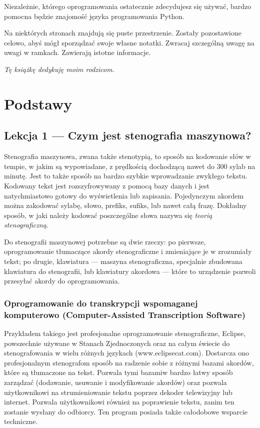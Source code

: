 \documentclass[12p, oneside]{book}
\begin{document}
Niezależnie, którego oprogramowania ostatecznie zdecydujesz się używać, bardzo pomocna będzie znajomość języka programowania Python.

Na niektórych stronach znajdują się puste przestrzenie. Zostały pozostawione celowo, abyś mógł sporządzać swoje własne notatki. Zwracaj szczególną uwagę na uwagi w ramkach. Zawierają istotne informacje.

\clearpage
\begin{center}
\thispagestyle{empty}
\vspace*{\fill}
{\em Tę książkę dedykuję moim rodzicom.}
\vspace*{\fill}
\end{center}
\clearpage

\mainmatter

\chapter{Podstawy}

\section{Lekcja 1 --- Czym jest stenografia maszynowa?}
Stenografia maszynowa, zwana także stenotypią, to sposób na kodowanie słów w tempie, w jakim są wypowiadane, z prędkością dochodzącą nawet do 300 sylab na minutę. Jest to także sposób na bardzo szybkie wprowadzanie zwykłego tekstu. Kodowany tekst jest rozszyfrowywany z pomocą bazy danych i jest natychmiastowo gotowy do wyświetlenia lub zapisania. Pojedynczym akordem można zakodować sylabę, słowo, prefiks, sufiks, lub nawet całą frazę. Dokładny sposób, w jaki należy kodować poszczególne słowa nazywa się \emph{teorią stenograficzną}.

Do stenografii maszynowej potrzebne są dwie rzeczy: po pierwsze, oprogramowanie tłumaczące akordy stenograficzne i zmieniające je w zrozumiały tekst; po drugie, klawiatura --- maszyna stenograficzna, specjalnie zbudowana klawiatura do stenografii, lub klawiatury akordowa --- które to urządzenie pozwoli przesyłać akordy do oprogramowania.

\subsection{Oprogramowanie do transkrypcji wspomaganej komputerowo (Computer-Assisted Transcription Software)}
Przykładem takiego jest profesjonalne oprogramowanie stenograficzne, Eclipse, powszechnie używane w Stanach Zjednoczonych oraz na całym świecie do stenografowania w wielu różnych językach (www.eclipsecat.com). Dostarcza ono profesjonalnym stenografom sposób na radzenie sobie z różnymi bazami akordów, które są tłumaczone na tekst. Pozwala tymi bazamiw  bardzo łatwy sposób zarządzać (dodawanie, usuwanie i modyfikowanie akordów) oraz pozwala użytkownikowi na strumieniowanie tekstu poprzez dekoder telewizyjny lub internet. Pozwala użytkownikowi również na poprawienie tekstu, zanim ten zostanie wysłany do odbiorcy. Ten program posiada także całodobowe wsparcie techniczne.
\end{document}
